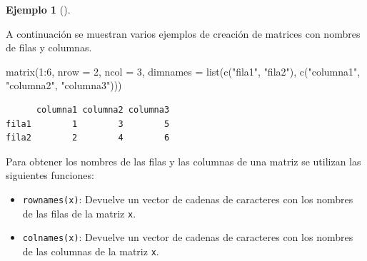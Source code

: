\documentclass[
  a4paper,
]{scrreport}
\newenvironment{Shaded}{\begin{snugshade}}{\end{snugshade}}
\newcommand{\AttributeTok}[1]{\textcolor[rgb]{0.40,0.45,0.13}{#1}}
\newcommand{\DecValTok}[1]{\textcolor[rgb]{0.68,0.00,0.00}{#1}}
\newcommand{\FunctionTok}[1]{\textcolor[rgb]{0.28,0.35,0.67}{#1}}
\newcommand{\NormalTok}[1]{\textcolor[rgb]{0.00,0.23,0.31}{#1}}
\newcommand{\SpecialCharTok}[1]{\textcolor[rgb]{0.37,0.37,0.37}{#1}}
\newcommand{\StringTok}[1]{\textcolor[rgb]{0.13,0.47,0.30}{#1}}
\providecommand{\tightlist}{%
  \setlength{\itemsep}{0pt}\setlength{\parskip}{0pt}}\usepackage{longtable,booktabs,array}
\theoremstyle{definition}
\newtheorem{example}{Ejemplo}[chapter]
\theoremstyle{definition}
\theoremstyle{remark}
\begin{document}
\leavevmode{}%
\begin{example}[]\label{exm-creacion-matrices-con-nombres}

A continuación se muestran varios ejemplos de creación de matrices con
nombres de filas y columnas.

\begin{Shaded}
\begin{Highlighting}[]
\FunctionTok{matrix}\NormalTok{(}\DecValTok{1}\SpecialCharTok{:}\DecValTok{6}\NormalTok{, }\AttributeTok{nrow =} \DecValTok{2}\NormalTok{, }\AttributeTok{ncol =} \DecValTok{3}\NormalTok{, }\AttributeTok{dimnames =} \FunctionTok{list}\NormalTok{(}\FunctionTok{c}\NormalTok{(}\StringTok{"fila1"}\NormalTok{, }\StringTok{"fila2"}\NormalTok{), }\FunctionTok{c}\NormalTok{(}\StringTok{"columna1"}\NormalTok{, }\StringTok{"columna2"}\NormalTok{, }\StringTok{"columna3"}\NormalTok{)))}
\end{Highlighting}
\end{Shaded}

\begin{verbatim}
      columna1 columna2 columna3
fila1        1        3        5
fila2        2        4        6
\end{verbatim}

\end{example}

Para obtener los nombres de las filas y las columnas de una matriz se
utilizan las siguientes funciones:

\begin{itemize}
\tightlist
\item
  \texttt{rownames(x)}: Devuelve un vector de cadenas de caracteres con
  los nombres de las filas de la matriz \texttt{x}.
\item
  \texttt{colnames(x)}: Devuelve un vector de cadenas de caracteres con
  los nombres de las columnas de la matriz \texttt{x}.
\end{itemize}
\end{document}
